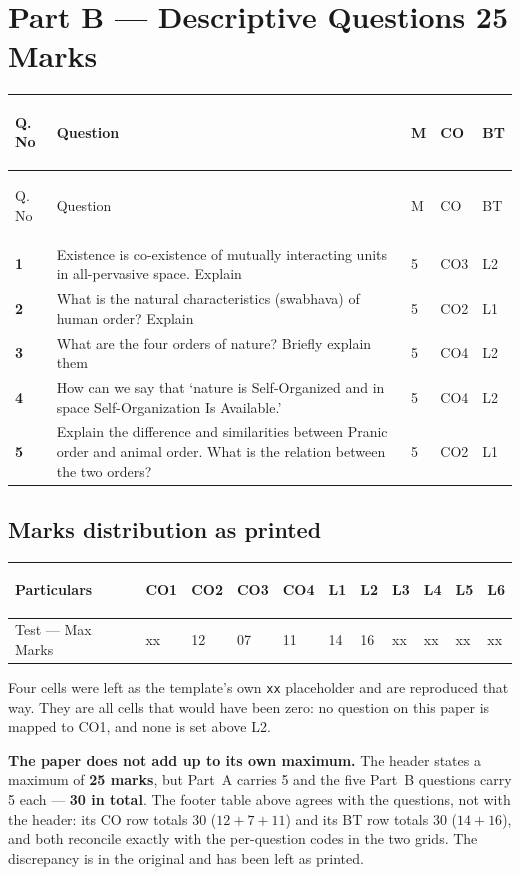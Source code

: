 \documentclass[11pt,a4paper,oneside]{book}
\makeatletter
\newcommand{\hdr}[1]{{\sffamily\bfseries\color{white}\strut #1}}
\newenvironment{qtable}
  {\renewcommand{\arraystretch}{1.28}%
   \arrayrulecolor{rulegrey}%
   \setlength{\LTpre}{6pt}\setlength{\LTpost}{4pt}%
   \begin{longtable}{C{11mm} P{108mm} C{10mm} C{12mm} C{9mm}}
   \rowcolor{slate}
   \hdr{Q.\,No} & \hdr{Question} & \hdr{M} & \hdr{CO} & \hdr{BT}
   \\ \hline \endfirsthead
   \rowcolor{slate}
   \hdr{Q.\,No} & \hdr{Question} & \hdr{M} & \hdr{CO} & \hdr{BT}
   \\ \hline \endhead}
  {\end{longtable}}
\newcommand{\qn}[1]{{\sffamily\bfseries\color{ocre}#1}}
\newenvironment{mdtable}
  {\renewcommand{\arraystretch}{1.3}%
   \arrayrulecolor{rulegrey}%
   \begin{tabular}{@{}P{38mm} C{11mm}C{11mm}C{11mm}C{11mm}
                        C{9mm}C{9mm}C{9mm}C{9mm}C{9mm}C{9mm}@{}}
   \rowcolor{slate}
   \hdr{Particulars} & \hdr{CO1} & \hdr{CO2} & \hdr{CO3} & \hdr{CO4} &
   \hdr{L1} & \hdr{L2} & \hdr{L3} & \hdr{L4} & \hdr{L5} & \hdr{L6}
   \\ \hline}
  {\end{tabular}}
\newenvironment{note}
  {\begin{tcolorbox}[colback=tint,colframe=ocre,boxrule=0.8pt,sharp corners,
     fontupper=\small,breakable,before skip=8pt,after skip=8pt]}
  {\end{tcolorbox}}
\makeatother
\begin{document}
\section[Part B --- Descriptive Questions]{Part B --- Descriptive Questions
  \hfill 25 Marks}

\begin{qtable}
\qn{1} & Existence is co-existence of mutually interacting units in
  all-pervasive space. Explain & 5 & CO3 & L2 \\ \hline
\qn{2} & What is the natural characteristics (swabhava) of human order?
  Explain & 5 & CO2 & L1 \\ \hline
\qn{3} & What are the four orders of nature? Briefly explain them
  & 5 & CO4 & L2 \\ \hline
\qn{4} & How can we say that `nature is Self-Organized and in space
  Self-Organization Is Available.' & 5 & CO4 & L2 \\ \hline
\qn{5} & Explain the difference and similarities between Pranic order and
  animal order. What is the relation between the two orders? & 5 & CO2 & L1
  \\ \hline
\end{qtable}

\subsection*{Marks distribution as printed}

\begin{mdtable}
Test --- Max Marks & xx & 12 & 07 & 11 & 14 & 16 & xx & xx & xx & xx \\ \hline
\end{mdtable}

\vspace{4pt}
Four cells were left as the template's own \texttt{xx} placeholder and are
reproduced that way. They are all cells that would have been zero: no question
on this paper is mapped to CO1, and none is set above L2.

\begin{note}
\textbf{\sffamily The paper does not add up to its own maximum.} The header
states a maximum of \textbf{25 marks}, but Part~A carries 5 and the five
Part~B questions carry 5 each --- \textbf{30 in total}. The footer table above
agrees with the questions, not with the header: its CO row totals 30
($12+7+11$) and its BT row totals 30 ($14+16$), and both reconcile exactly
with the per-question codes in the two grids. The discrepancy is in the
original and has been left as printed.
\end{note}
\end{document}
